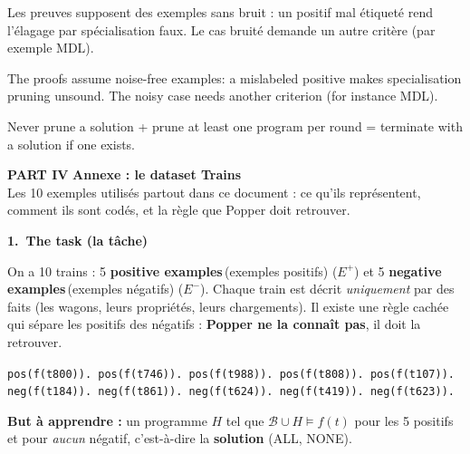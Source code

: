 \documentclass[10pt]{article}
\newcommand{\EN}[2]{\textbf{#1}\,{\scriptsize\textcolor{marine}{(#2)}}}
\newcommand{\titrebox}[2]{\needspace{10\baselineskip}\vspace{8pt}
  \begin{tcolorbox}[colback=marine, colframe=marine, arc=0pt, boxrule=0pt,
    top=4pt, bottom=4pt, left=8pt]
  \color{white}\Large\bfseries #1.~#2
  \end{tcolorbox}\vspace{2pt}}
\newcommand{\st}[1]{\par\needspace{7\baselineskip}\vspace{5pt}{\normalsize\bfseries\textcolor{marine}{#1}}\par\vspace{2pt}}
\newcommand{\partie}[3]{\newpage
  \begin{tcolorbox}[colback=pastel, colframe=pastel, arc=0pt, boxrule=0pt,
    top=8pt, bottom=8pt, left=10pt]
  {\fontsize{26}{28}\selectfont\bfseries\textcolor{marine}{PART #1}}\quad
  {\Large\bfseries\textcolor{encre}{#2}}\\[2pt]{\small #3}
  \end{tcolorbox}\vspace{4pt}}
\begin{document}
\st{``Et avec du bruit dans les données ?''}
\begin{dire}
Les preuves supposent des exemples sans bruit : un positif mal étiqueté rend l'élagage par spécialisation faux. Le cas bruité demande un autre critère (par exemple MDL).
\end{dire}
\begin{direEN}
The proofs assume noise-free examples: a mislabeled positive makes specialisation pruning unsound. The noisy case needs another criterion (for instance MDL).
\end{direEN}

\vspace{8pt}
\begin{tcolorbox}[colback=marine, colframe=marine, arc=0pt, boxrule=0pt,
  halign=center, top=4pt, bottom=4pt]
\color{white}\small Never prune a solution + prune at least one program per round = terminate with a solution if one exists.
\end{tcolorbox}


\partie{IV}{Annexe : le dataset Trains}{Les 10 exemples utilisés partout dans ce document : ce qu'ils représentent, comment ils sont codés, et la règle que Popper doit retrouver.}

\titrebox{1}{The task (la tâche)}
On a 10 trains : 5 \EN{positive examples}{exemples positifs} ($E^+$) et 5 \EN{negative examples}{exemples négatifs} ($E^-$). Chaque train est décrit
\emph{uniquement} par des faits (les wagons, leurs propriétés, leurs chargements). Il existe une règle cachée qui sépare les positifs des négatifs :
\textbf{Popper ne la connaît pas}, il doit la retrouver.
\begin{moi}
\texttt{pos(f(t800)). pos(f(t746)). pos(f(t988)). pos(f(t808)). pos(f(t107)).}\\
\texttt{neg(f(t184)). neg(f(t861)). neg(f(t624)). neg(f(t419)). neg(f(t623)).}
\end{moi}
\textbf{But à apprendre :} un programme $H$ tel que $\mathcal{B}\cup H\models f(t)$ pour les 5 positifs et pour \emph{aucun} négatif, c'est-à-dire la \textbf{solution} (ALL, NONE).
\end{document}
